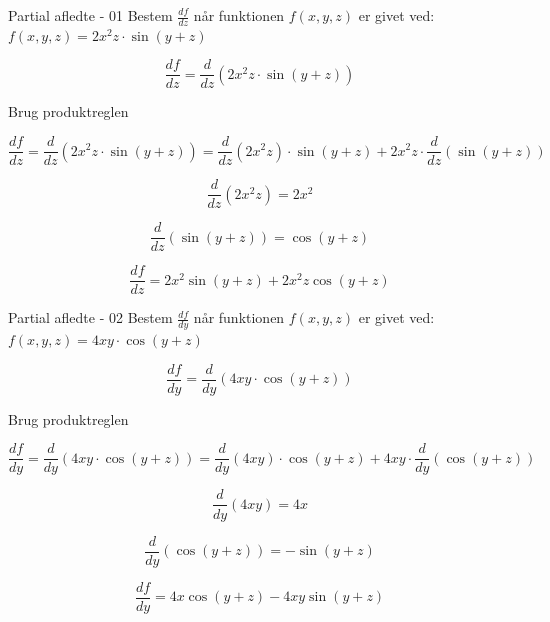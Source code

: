 \documentclass{article}
\begin{document}
\tableofcontents
\newpage

\begin{exercise}{Partial afledte - 01}
Bestem $\frac{df}{dz}$ når funktionen $f(x,y,z)$ er givet ved:
$f(x,y,z) = 2x^2 z \cdot \sin(y + z)$


\hint
\[
\frac{df}{dz} = \frac{d}{dz} \left( 2x^2 z \cdot \sin(y + z)\right)
\]

\hint
Brug produktreglen

\hint
\[
\frac{df}{dz} = \frac{d}{dz} \left( 2x^2 z \cdot \sin(y + z)\right) = \frac{d}{dz} \left( 2x^2 z \right) \cdot \sin(y + z) + 2x^2z \cdot \frac{d}{dz}\left( \sin(y + z)\right)
\]

\hint
\[
\frac{d}{dz} \left( 2x^2 z \right) = 2x^2
\]

\hint
\[
\frac{d}{dz}\left( \sin(y + z)\right) = \cos(y + z)
\]

\hint
\[
\frac{df}{dz} = 2x^2 \sin(y + z) + 2x^2z \cos(y + z)
\]


\end{exercise}

\begin{exercise}{Partial afledte - 02}
Bestem $\frac{df}{dy}$ når funktionen $f(x,y,z)$ er givet ved:
$f(x,y,z) = 4xy \cdot \cos(y + z)$


\hint
\[
\frac{df}{dy} = \frac{d}{dy} \left( 4xy \cdot \cos(y + z)\right)
\]

\hint
Brug produktreglen

\hint
\[
\frac{df}{dy} = \frac{d}{dy} \left( 4xy \cdot \cos(y + z)\right) = \frac{d}{dy} \left(4xy \right) \cdot \cos(y + z) + 4xy \cdot \frac{d}{dy}\left( \cos(y + z)\right)
\]

\hint
\[
\frac{d}{dy} \left(4xy\right) = 4x
\]

\hint
\[
\frac{d}{dy}\left( \cos(y + z)\right) = - \sin(y + z)
\]

\hint
\[
\frac{df}{dy} = 4x \cos(y + z) - 4xy \sin(y + z)
\]


\end{exercise}
\end{document}
